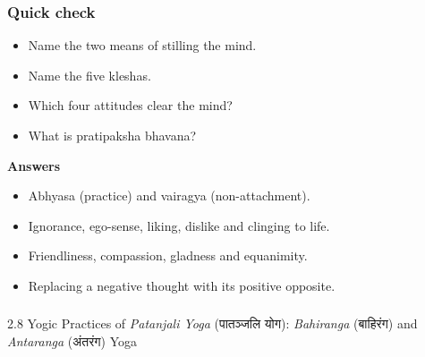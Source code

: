 \begin{frame}[fragile]\frametitle{Quick check}

\begin{itemize}
    \item Name the two means of stilling the mind.
    \item Name the five kleshas.
    \item Which four attitudes clear the mind?
    \item What is pratipaksha bhavana?
\end{itemize}
\vspace{0.5em}
\textbf{Answers}
\begin{itemize}
    \item Abhyasa (practice) and vairagya (non-attachment).
    \item Ignorance, ego-sense, liking, dislike and clinging to life.
    \item Friendliness, compassion, gladness and equanimity.
    \item Replacing a negative thought with its positive opposite.
\end{itemize}

\end{frame}

\begin{frame}[fragile]\frametitle{}
\begin{center}
{\Large 2.8 Yogic Practices of \textit{Patanjali Yoga} (पातञ्जलि योग): \textit{Bahiranga} (बाहिरंग) and \textit{Antaranga} (अंतरंग) Yoga}
\end{center}
\end{frame}



